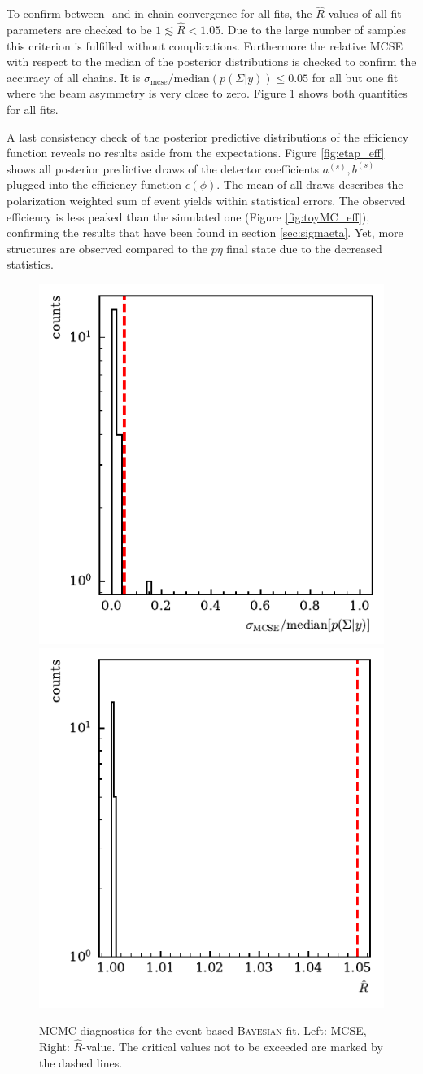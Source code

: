 To confirm between- and in-chain convergence for all fits, the $\widehat{R}$-values of all fit parameters are checked to be $1\lesssim\widehat{R}<1.05$. Due to the large number of samples this criterion is fulfilled without complications. Furthermore the relative MCSE with respect to the median of the posterior distributions is checked to confirm the accuracy of all chains. It is $\sigma_\text{mcse}/\text{median}\left(p(\Sigma|y)\right)\leq0.05$ for all but one fit where the beam asymmetry is very close to zero. Figure \ref{fig:etapdiagnostics} shows both quantities for all fits.

A last consistency check of the posterior predictive distributions of the efficiency function reveals no results aside from the expectations. Figure \ref{fig:etap_eff} shows all posterior predictive draws of the detector coefficients $a^{(s)},b^{(s)}$ plugged into the efficiency function $\epsilon\left(\phi\right)$. The mean of all draws describes the polarization weighted sum of event yields within statistical errors. The observed efficiency is less peaked than the simulated one (Figure \ref{fig:toyMC_eff}), confirming the results that have been found in section \ref{sec:sigmaeta}. Yet, more structures are observed compared to the $p\eta$ final state due to the decreased statistics.
\begin{figure}[htbp]
	\centering
	\includegraphics[width=.49\linewidth]{../bayes/etap_event_based_fit/plots/mcse_hist.pdf}
	\includegraphics[width=.49\linewidth]{../bayes/etap_event_based_fit/plots/rhat_hist.pdf}
	\caption{MCMC diagnostics for the event based \textsc{Bayesian} fit. Left: MCSE, Right: $\widehat{R}$-value. The critical values not to be exceeded are marked by the dashed lines.}
	\label{fig:etapdiagnostics}
\end{figure}
